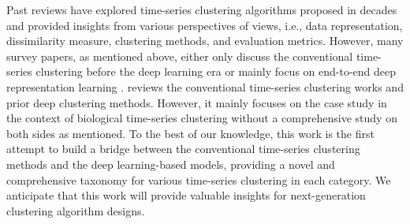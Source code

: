 Past reviews \cite{aghabozorgi2015time,liao2005clustering} have explored time-series clustering algorithms proposed in decades and provided insights from various perspectives of views, i.e., data representation, dissimilarity measure, clustering methods, and evaluation metrics. However, many survey papers, as mentioned above, either only discuss the conventional time-series clustering before the deep learning era \cite{aghabozorgi2015time,liao2005clustering} or mainly focus on end-to-end deep representation learning \cite{lafabregue2021end}. \cite{alqahtani2021deep} reviews the conventional time-series clustering works and prior deep clustering methods. However, it mainly focuses on the case study in the context of biological time-series clustering without a comprehensive study on both sides as mentioned. To the best of our knowledge, this work is the first attempt to build a bridge between the conventional time-series clustering methods and the deep learning-based models, providing a novel and comprehensive taxonomy for various time-series clustering in each category. We anticipate that this work will provide valuable insights for next-generation clustering algorithm designs.







		
